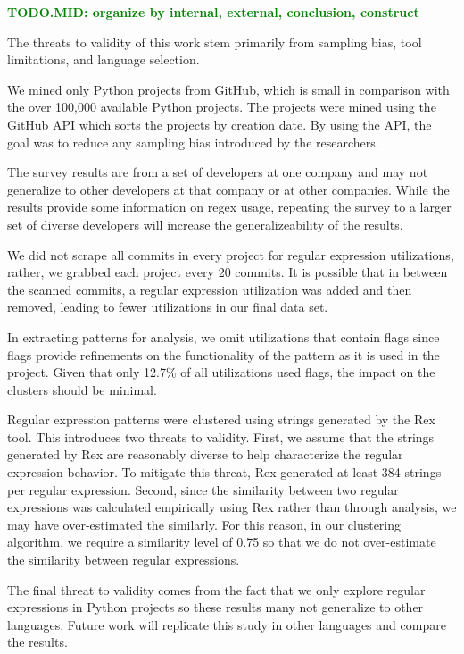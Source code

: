 \documentclass{sig-alternate}
\newcommand{\todoMid}[1]{\textbf{\textcolor{green}{TODO.MID: #1}}} %
\begin{document}
\todoMid{organize by internal, external, conclusion, construct}

The threats to validity of this work stem primarily from sampling bias, tool limitations, and language selection.

We mined only  Python projects from GitHub, which is  small in comparison with the over 100,000 available Python projects. The projects were mined using the GitHub API which sorts the projects by creation date. By using the API, the goal was to reduce any sampling bias introduced by the researchers.

The survey results are from a set of developers at one company and may not generalize to other developers at that company or at other companies. While the results provide some information on regex usage, repeating the survey to a larger set of diverse developers will increase the generalizeability of the results.

We did not scrape all commits in every project for regular expression utilizations, rather, we grabbed each project every 20 commits. It is possible that in between the scanned commits, a regular expression utilization was added and then removed, leading to fewer utilizations in our final data set.

In extracting patterns for analysis, we omit utilizations that contain flags since flags provide refinements on the functionality of the pattern as it is used in the project. Given that only 12.7\% of all utilizations used flags, the impact on the clusters should be minimal.


Regular expression patterns were clustered using strings generated by the Rex tool. This introduces two threats to validity. First, we assume that the strings generated by Rex are reasonably diverse to help characterize the regular expression behavior. To mitigate this threat, Rex generated at least 384 strings per regular expression. Second, since the similarity between two regular expressions was calculated empirically using Rex rather than through analysis, we may have over-estimated the similarly. For this reason, in our clustering algorithm, we require a similarity level of 0.75 so that we do not over-estimate the similarity between regular  expressions.

The final threat to validity comes from the fact that we only explore regular expressions in Python projects so these results many not generalize to other languages. Future work will replicate this study in other languages and compare the results.
\end{document}
